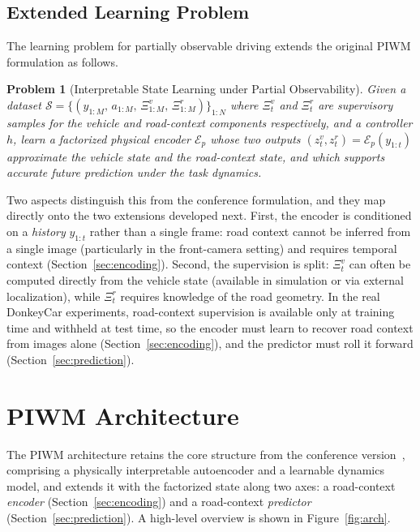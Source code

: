 \documentclass[preprint,12pt]{elsarticle}
\newtheorem{problem}{Problem}
\newcommand{\zv}{z^{v}}      %
\newcommand{\zr}{z^{r}}      %
\begin{document}
\subsection{Extended Learning Problem}

The learning problem for partially observable driving extends the original PIWM
formulation as follows.

\begin{problem}[Interpretable State Learning under Partial Observability]
\label{def:po_problem}
Given a dataset
$\mathcal{S} = \{(y_{1:M},\, a_{1:M},\, \Xi^{v}_{1:M},\, \Xi^{r}_{1:M})\}_{1:N}$
where $\Xi^{v}_t$ and $\Xi^{r}_t$ are supervisory samples for the vehicle and
road-context components respectively, and a controller $h$, learn a factorized
physical encoder $\mathcal{E}_p$ whose two outputs
$(\zv_t, \zr_t) = \mathcal{E}_p(y_{1:t})$ approximate the vehicle state and the
road-context state, and which supports accurate future prediction under the task
dynamics.
\end{problem}

Two aspects distinguish this from the conference formulation, and they map
directly onto the two extensions developed next.
First, the encoder is conditioned on a \emph{history} $y_{1:t}$ rather than a
single frame: road context cannot be inferred from a single image (particularly
in the front-camera setting) and requires temporal context
(Section~\ref{sec:encoding}).
Second, the supervision is split: $\Xi^v_t$ can often be computed directly from
the vehicle state (available in simulation or via external localization), while
$\Xi^r_t$ requires knowledge of the road geometry.
In the real DonkeyCar experiments, road-context supervision is available only at
training time and withheld at test time, so the encoder must learn to recover
road context from images alone (Section~\ref{sec:encoding}), and the predictor
must roll it forward (Section~\ref{sec:prediction}).


\section{PIWM Architecture}\label{sec:architecture}

The PIWM architecture retains the core structure from the conference
version~\cite{piwm_conf}, comprising a physically interpretable autoencoder and a
learnable dynamics model, and extends it with the factorized state along two
axes: a road-context \emph{encoder} (Section~\ref{sec:encoding}) and a
road-context \emph{predictor} (Section~\ref{sec:prediction}).
A high-level overview is shown in Figure~\ref{fig:arch}.
\end{document}
